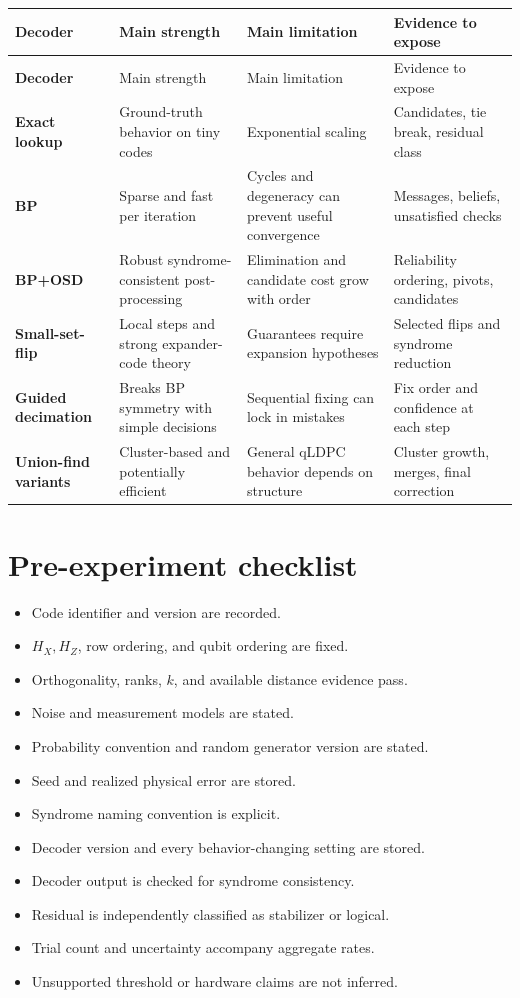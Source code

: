 \documentclass[11pt,letterpaper]{article}
\begin{document}
\begin{longtable}{>{\bfseries}p{} p{} p{} p{}}
\toprule
Decoder & Main strength & Main limitation & Evidence to expose \\
\midrule
\endfirsthead
\toprule
Decoder & Main strength & Main limitation & Evidence to expose \\
\midrule
\endhead
Exact lookup & Ground-truth behavior on tiny codes & Exponential scaling & Candidates, tie break, residual class \\
BP & Sparse and fast per iteration & Cycles and degeneracy can prevent useful convergence & Messages, beliefs, unsatisfied checks \\
BP+OSD & Robust syndrome-consistent post-processing & Elimination and candidate cost grow with order & Reliability ordering, pivots, candidates \\
Small-set-flip & Local steps and strong expander-code theory & Guarantees require expansion hypotheses & Selected flips and syndrome reduction \\
Guided decimation & Breaks BP symmetry with simple decisions & Sequential fixing can lock in mistakes & Fix order and confidence at each step \\
Union-find variants & Cluster-based and potentially efficient & General qLDPC behavior depends on structure & Cluster growth, merges, final correction \\
\bottomrule
\end{longtable}

\section{Pre-experiment checklist}

\begin{itemize}[label=$\square$]
  \item Code identifier and version are recorded.
  \item $H_X,H_Z$, row ordering, and qubit ordering are fixed.
  \item Orthogonality, ranks, $k$, and available distance evidence pass.
  \item Noise and measurement models are stated.
  \item Probability convention and random generator version are stated.
  \item Seed and realized physical error are stored.
  \item Syndrome naming convention is explicit.
  \item Decoder version and every behavior-changing setting are stored.
  \item Decoder output is checked for syndrome consistency.
  \item Residual is independently classified as stabilizer or logical.
  \item Trial count and uncertainty accompany aggregate rates.
  \item Unsupported threshold or hardware claims are not inferred.
\end{itemize}
\end{document}
